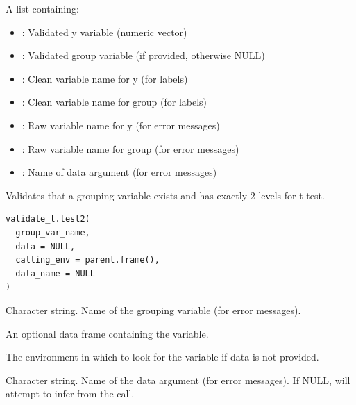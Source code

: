 \documentclass[a4paper]{book}
\begin{document}
%
\begin{Value}
A list containing:
\begin{itemize}

\item{} : Validated y variable (numeric vector)
\item{} : Validated group variable (if provided, otherwise NULL)
\item{} : Clean variable name for y (for labels)
\item{} : Clean variable name for group (for labels)
\item{} : Raw variable name for y (for error messages)
\item{} : Raw variable name for group (for error messages)
\item{} : Name of data argument (for error messages)

\end{itemize}

\end{Value}
%
\begin{Description}
Validates that a grouping variable exists and has exactly 2 levels for t-test.
\end{Description}
%
\begin{Usage}
\begin{verbatim}
validate_t.test2(
  group_var_name,
  data = NULL,
  calling_env = parent.frame(),
  data_name = NULL
)
\end{verbatim}
\end{Usage}
%
\begin{Arguments}
\begin{ldescription}
\item[\code{group\_var\_name}] Character string. Name of the grouping variable (for error messages).

\item[\code{data}] An optional data frame containing the variable.

\item[\code{calling\_env}] The environment in which to look for the variable if data is not provided.

\item[\code{data\_name}] Character string. Name of the data argument (for error messages).
If NULL, will attempt to infer from the call.
\end{ldescription}
\end{Arguments}
\end{document}
